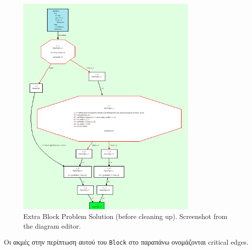 \begin{figure}[h]
\centering
\includegraphics[width=0.8\textwidth]{needs-extra-block-med.png}
\caption{Extra Block Problem Solution (before cleaning up).
Screenshot from the diagram editor.}
\label{figure-8c}
\end{figure}


Οι ακμές στην περίπτωση αυτού του \texttt{Block} στο παραπάνω ονομάζονται
critical edges.

